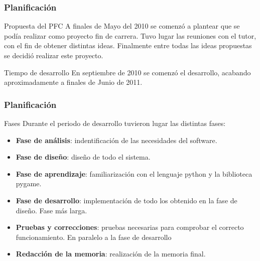 \begin{frame}
    \frametitle{Planificación}

        \begin{block}{Propuesta del PFC}
            A finales de Mayo del 2010 se comenzó a plantear que se podía realizar como proyecto fin de carrera. 
            Tuvo lugar las reuniones con el tutor, con el fin de obtener distintas ideas. Finalmente entre todas las ideas
            propuestas se decidió realizar este proyecto.
        \end{block}
        
        \begin{block}{Tiempo de desarrollo}
            En septiembre de 2010 se comenzó el desarrollo, acabando aproximadamente a finales de Junio de 2011.
        \end{block}

\end{frame}

\begin{frame}
    \frametitle{Planificación}
        
        \begin{block}{Fases}
        Durante el periodo de desarrollo tuvieron lugar las distintas fases:
            \begin{itemize}
                \item \textbf{Fase de análisis}: indentificación de las necesidades del software.
                \item \textbf{Fase de diseño}: diseño de todo el sistema.
                \item \textbf{Fase de aprendizaje}: familiarización con el lenguaje python y la biblioteca pygame.
                \item \textbf{Fase de desarrollo}: implementación de todo los obtenido en la fase de diseño. Fase más larga.
                \item \textbf{Pruebas y correcciones}: pruebas necesarias para comprobar el correcto funcionamiento. En paralelo a
                la fase de desarrollo
                \item \textbf{Redacción de la memoria}: realización de la memoria final. 
            \end{itemize}
        \end{block}

\end{frame}

